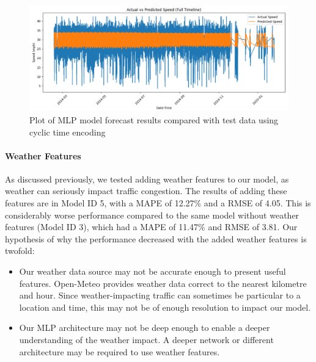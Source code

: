 \begin{figure}[!ht]
  \centering
  \includegraphics[width=\textwidth]{images/results-discussions/cyclic.pdf}
  \caption{Plot of MLP model forecast results compared with test data using cyclic time encoding}
  \label{fig:cyclic}
\end{figure}

\paragraph{Weather Features}
As discussed previously, we tested adding weather features to our model, as weather can seriously impact traffic congestion. The results of adding these features are in Model ID 5, with a MAPE of 12.27\% and a RMSE of 4.05. This is considerably worse performance compared to the same model without weather features (Model ID 3), which had a MAPE of 11.47\% and RMSE of 3.81. Our hypothesis of why the performance decreased with the added weather features is twofold:
\begin{itemize}
    \item Our weather data source may not be accurate enough to present useful features. Open-Meteo provides weather data correct to the nearest kilometre and hour. Since weather-impacting traffic can sometimes be particular to a location and time, this may not be of enough resolution to impact our model.
    \item Our MLP architecture may not be deep enough to enable a deeper understanding of the weather impact. A deeper network or different architecture may be required to use weather features.
\end{itemize}

